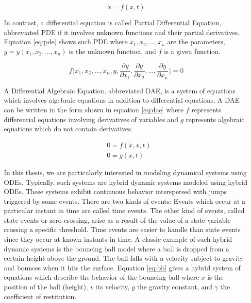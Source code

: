 \begin{equation}
\dot{x} = f(x,t)
\label{eq:ode}
\end{equation}

In contrast, a differential equation is called Partial Differential Equation, abbreviated PDE if it involves unknown functions and their partial derivatives. Equation \ref{eq:pde} shows such PDE where $x_1,x_2,\dots, x_n$ are the parameters, $y=y(x_1,x_2,\dots, x_n)$ is the unknown function, and $f$ is a given function.

\begin{equation}
f\biggl(x_1,x_2,\dots, x_n,y,\frac{\partial y}{\partial x_1},\frac{\partial y}{\partial x_2},\dots,\frac{\partial y}{\partial x_n}\biggl)=0
\label{eq:pde}
\end{equation} 

A Differential Algebraic Equation, abbreviated DAE, is a system of equations which involves algebraic equations in addition to differential equations. A DAE can be written in the form shown in equation \ref{eq:dae} where $f$ represents differential equations involving derivatives of variables and $g$ represents algebraic equations which do not contain derivatives.

\begin{equation}
\begin{aligned}
&0 = f(\dot{x},x,t)\\
&0 = g(x,t)
\end{aligned}
\label{eq:dae}
\end{equation} 
  
In this thesis, we are particularly interested in modeling dynamical systems using ODEs. Typically, such systems are hybrid dynamic systems modeled using hybrid ODEs. These systems exhibit continuous behavior interspersed with jumps triggered by some events. There are two kinds of events: Events which occur at a particular instant in time are called time events. The other kind of events, called state events or zero-crossing, arise as a result of the value of a state variable crossing a specific threshold. Time events are easier to handle than state events since they occur at known instants in time. A classic example of such hybrid dynamic systems is the bouncing ball model where a ball is dropped from a certain height above the ground. The ball falls with a velocity subject to gravity and bounces when it hits the surface. Equation \ref{eq:bb} gives a hybrid system of equations which describe the behavior of the bouncing ball where $x$ is the position of the ball (height), $v$ its velocity, $g$ the gravity constant, and $\gamma$ the coefficient of restitution.

